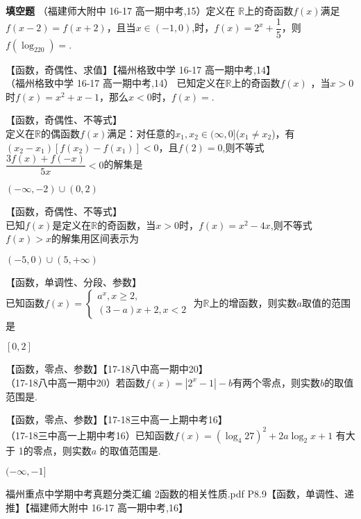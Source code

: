 \begin{exercise}{\bf 填空题}
      （福建师大附中 16-17 高一期中考,15）定义在 $\mathbb{R}$上的奇函数$f(x)$满足 $f(x-2)=f(x+2)$，且当$x\in(-1,0)$,时，$f(x)=2^x+\dfrac15$，则$f(\log_220)=$\tk.
    \item 【函数，奇偶性、求值】【福州格致中学 16-17 高一期中考,14】\\
      （福州格致中学 16-17 高一期中考,14） 已知定义在$\mathbb{R}$上的奇函数$f(x)$ ，当$x>0$时$f(x)=x^2+x-1$，那么$x<0$时，$f(x)=$\tk.
    \item 【函数，奇偶性、不等式】\\
       定义在$\mathbb{R}$的偶函数$f(x)$满足：对任意的$x_1,x_2\in(\infty,0]$($x_1\neq x_2$)，有
      $(x_2-x_1)[f(x_2)-f(x_1)]<0$，且$f(2)=0$,则不等式$\dfrac{3f(x)+f(-x)}{5x}<0$的解集是\tk
      \begin{answer}
        $(-\infty,-2)\cup (0,2)$
      \end{answer}
    \item 【函数，奇偶性、不等式】\\
      已知$f(x)$是定义在$\mathbb{R}$的奇函数，当$x>0$时，$f(x)=x^2-4x$,则不等式$f(x)>x$的解集用区间表示为\tk
      \begin{answer}
        $(-5,0)\cup(5,+\infty)$
      \end{answer}
    \item 【函数，单调性、分段、参数】\\
      已知函数$f(x)=\begin{cases}
        a^x,x\geq 2,\\(3-a)x+2,x<2
      \end{cases}$
      为$\mathbb{R}$上的增函数，则实数$a$取值的范围是\tk
      \begin{answer}
        $[0,2]$
      \end{answer}
    \item 【函数，零点、参数】【17-18八中高一期中20】\\
      （17-18八中高一期中20）若函数$f(x)=|2^x-1|-b $有两个零点，则实数$b$的取值范围是\tk.
    \item 【函数，零点、参数】【17-18三中高一上期中考16】\\
      （17-18三中高一上期中考16）已知函数$f(x)=(\log_4 27)^2+2a\log_2x+1 $ 有大于 1的零点，则实数$a$ 的取值范围是\tk.
      \begin{answer}
        $(-\infty,-1]$
      \end{answer}
    \item 福州重点中学期中考真题分类汇编 2函数的相关性质.pdf P8.9【函数，单调性、递推】【福建师大附中 16-17 高一期中考,16】\\

\end{exercise}
